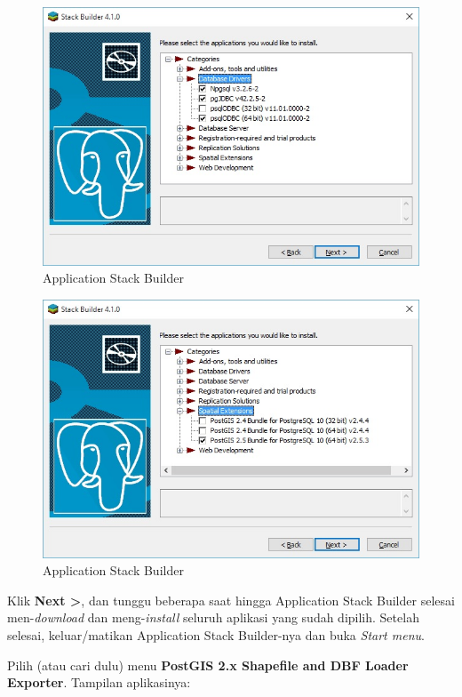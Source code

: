 \documentclass[]{book}
\begin{document}
\begin{itemize}
  \begin{figure}
  \centering
  \includegraphics{./img/stack-builder-db-driver.jpg}
  \caption{Application Stack Builder}
  \end{figure}

  \begin{figure}
  \centering
  \includegraphics{./img/stack-builder-postgis.jpg}
  \caption{Application Stack Builder}
  \end{figure}

  Klik \textbf{Next \textgreater{}}, dan tunggu beberapa saat hingga Application Stack Builder selesai men-\emph{download} dan meng-\emph{install} seluruh aplikasi yang sudah dipilih. Setelah selesai, keluar/matikan Application Stack Builder-nya dan buka \emph{Start menu}.

  Pilih (atau cari dulu) menu \textbf{PostGIS 2.x Shapefile and DBF Loader Exporter}. Tampilan aplikasinya:


\end{itemize}
\end{document}
